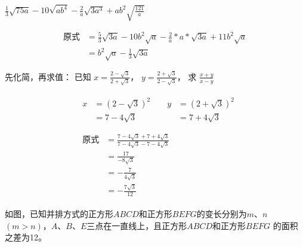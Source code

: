 \documentclass[answers]{exam} %
\begin{document}
\begin{questions}

\question
  $\frac{1}{3}\sqrt{75a} - 10 \sqrt{ab^4} - \frac{2}{a}\sqrt{3a^3} + ab^2 \sqrt{\frac{121}{a}} $

  \vspace*{1in}
  \begin{solution}
    \[
      \begin{aligned}
        \mbox{原式} &= \frac{5}{3} \sqrt{3a} - 10b^2 \sqrt{a} - \frac{2}{a} * a * \sqrt{3a} + 11b^2 \sqrt{a} \\
        &= b^2 \sqrt{a} - \frac{1}{3} \sqrt{3a}
      \end{aligned}
    \]
  \end{solution}

\question
  先化简，再求值： 已知
  $x = \frac{ 2 - \sqrt{3} }{ 2 + \sqrt{3} }$，
  $y = \frac{ 2 + \sqrt{3} }{ 2 - \sqrt{3} }$，
  求 $\frac{x + y}{x - y}$

  \vspace*{1in}
  \begin{solution}
    \[
      \begin{aligned}
        & \begin{aligned}
        x &= (2 - \sqrt{3})^2 \qquad y &= (2 + \sqrt{3})^2 \\
        &= 7 - 4 \sqrt{3} \qquad &= 7 + 4 \sqrt{3} \\
        \end{aligned} \\
        & \begin{aligned}
          \mbox{原式} &= \frac{7 - 4 \sqrt{3} + 7 + 4 \sqrt{3}}{7 - 4 \sqrt{3} - 7 - 4 \sqrt{3}} \\
          &= \frac{17}{- 8 \sqrt{3}} \\
          &= - \frac{7}{4 \sqrt{3}} \\
          &= - \frac{7 \sqrt{3}}{12}
        \end{aligned}
      \end{aligned}
  \]
  \end{solution}

\question
  如图，已知并排方式的正方形$ABCD$和正方形$BEFG$的变长分别为$m$、$n$
  $(m > n)$，$A$、$B$、$E$三点在一直线上，且正方形$ABCD$和正方形$BEFG$
  的面积之差为12。

\begin{center}
\end{center}


\end{questions}
\end{document}
